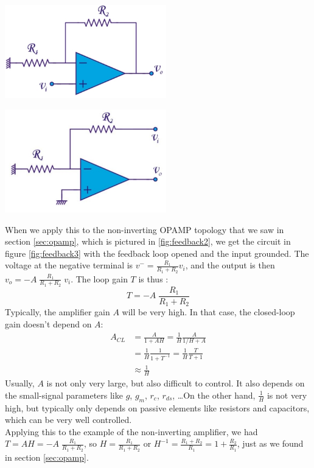 \begin{minipage}{.5\textwidth}
	\centering
	\includegraphics[width=7cm]{figures/ch02/opamp4.jpg}
	\label{fig:feedback2}
\end{minipage}%
\begin{minipage}{.5\textwidth}
	\centering
	\includegraphics[width=7cm]{figures/ch10/feedback3.jpg}
	\label{fig:feedback3}
\end{minipage}

When we apply this to the non-inverting OPAMP topology that we saw in section \ref{sec:opamp}, which is pictured in \ref{fig:feedback2}, we get the circuit in figure \ref{fig:feedback3} with the feedback loop opened and the input grounded. The voltage at the negative terminal is $v^- = \frac{R_1}{R_1 + R_2} v_i$, and the output is then $v_o = -A\;\frac{R_1}{R_1 + R_2} \; v_i$. The loop gain $T$ is thus :
$$
T =  -A\;\frac{R_1}{R_1 + R_2}
$$
Typically, the amplifier gain $A$ will be very high. In that case, the closed-loop gain doesn't depend on $A$:
\begin{align*}
	A_{CL} &= \frac{A}{1 + AH} = \frac{1}{H} \frac{A}{1/H + A} \\
		   &=  \frac{1}{H} \frac{1}{1 + T^{-1}} =  \frac{1}{H} \frac{T}{T + 1} \\
		   &\approx \frac{1}{H}
\end{align*}
Usually, $A$ is not only very large, but also difficult to control. It also depends on the small-signal parameters like $g$, $g_m$, $r_c$, $r_{ds}$, \ldots On the other hand, $\frac{1}{H}$ is not very high, but typically only depends on passive elements like resistors and capacitors, which can be very well controlled.\\
Applying this to the example of the non-inverting amplifier, we had $T = A H = -A\;\frac{R_1}{R_1 + R_2}$, so $H = \frac{R_1}{R_1 + R_2}$ or $H^{-1} = \frac{R_1 + R_2}{R_1} = 1 + \frac{R_2}{R_1}$, just as we found in section \ref{sec:opamp}.

